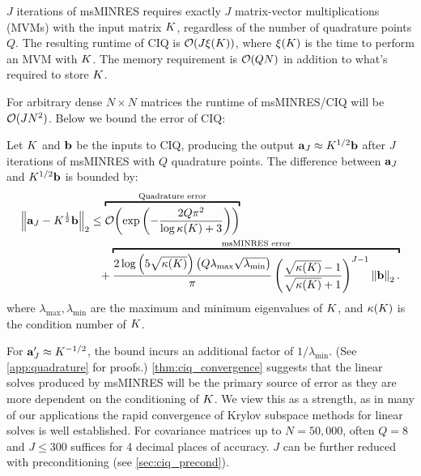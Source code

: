 \begin{property}
  $J$ iterations of msMINRES requires exactly $J$ matrix-vector multiplications (MVMs) with the input matrix $K$,
  regardless of the number of quadrature points $Q$.
  The resulting runtime of CIQ is $\bigo{ J \mvm{\bK}}$, where $\xi ( K )$ is the time to perform an MVM with $K$.
  The memory requirement is $\bigo{ QN }$ in addition to what's required to store $K$.
  \label{prop:msminres}
\end{property}
%
\noindent
For arbitrary dense $N \! \times \! N$ matrices the runtime of msMINRES/CIQ will be $\bigo{J N^2}$.
Below we bound the error of CIQ:
%
\begin{theorem}
  Let $K$ and $\mathbf{b}$ be the inputs to CIQ, producing the output $\mathbf{a}_J \approx K^{1/2} \mathbf{b}$ after $J$ iterations of msMINRES with $Q$ quadrature points.
  The difference between $\mathbf{a}_J$ and $K^{1/2} \mathbf{b}$ is bounded by:
  \begin{align*}
    \left\Vert \ba_J - \bK^{\frac 1 2} \bb \right\Vert_2
    &\leq
    \overbracket{
      \bigo{\exp\left( -\frac  {2 Q \pi^2}{\log \kappa(\bK) + 3} \right)}
    }^{\text{Quadrature error}}
    \\
    &\phantom{=} +
    \overbracket{
      \frac{ 2 \log \left( 5 \sqrt{\kappa(\bK)} \right)  \left( Q \lambda_\text{max} \sqrt{\lambda_\text{min}} \right) }{\pi}
      \left( \frac{ \sqrt{\kappa(\bK)} - 1}{ \sqrt{\kappa(\bK)} + 1} \right)^{J-1}
      \left\Vert \bb \right\Vert_2.
    }^{\text{msMINRES error}}
  \end{align*}
  where $\lambda_\text{max},\lambda_{\text{min}}$ are the maximum and minimum eigenvalues of $K$, and $\kappa(K)$ is the condition number of $K$.
  \label{thm:ciq_convergence}
\end{theorem}
%
\noindent
For $\mathbf{a}'_J \approx K^{-1/2}$, the bound incurs an additional factor of $1/\lambda_\text{min}$.
(See \cref{app:quadrature} for proofs.)
\cref{thm:ciq_convergence} suggests that the linear solves produced by msMINRES will be the primary source of error as they are more dependent on the conditioning of $K$.
We view this as a strength, as in many of our applications the rapid convergence of Krylov subspace methods for linear solves is well established.
For covariance matrices up to $N=50,\!000$, often $Q=8$ and $J\leq300$ suffices for 4 decimal places of accuracy.
$J$ can be further reduced with preconditioning (see \cref{sec:ciq_precond}).



